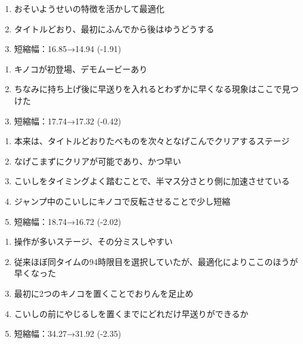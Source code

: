 \begin{enumerate}[label={\sarrow}]
\item おそいようせいの特徴を活かして最適化
\item タイトルどおり、最初にふんでから後はゆうどうする
\item 短縮幅：16.85→14.94 (-1.91)
\end{enumerate}



\begin{enumerate}[label={\sarrow}]
\item キノコが初登場、デモムービーあり
\item ちなみに持ち上げ後に早送りを入れるとわずかに早くなる現象はここで見つけた
\item 短縮幅：17.74→17.32 (-0.42)
\end{enumerate}



\clearpage
\begin{enumerate}[label={\sarrow}]
\item 本来は、タイトルどおりたべものを次々となげこんでクリアするステージ
\item なげこまずにクリアが可能であり、かつ早い
\item こいしをタイミングよく踏むことで、半マス分さとり側に加速させている
\item ジャンプ中のこいしにキノコで反転させることで少し短縮
\item 短縮幅：18.74→16.72 (-2.02)
\end{enumerate}



\begin{enumerate}[label={\sarrow}]
\item 操作が多いステージ、その分ミスしやすい
\item 従来ほぼ同タイムの94時限目を選択していたが、最適化によりここのほうが早くなった
\item 最初に2つのキノコを置くことでおりんを足止め
\item こいしの前にやじるしを置くまでにどれだけ早送りができるか
\item 短縮幅：34.27→31.92 (-2.35)
\end{enumerate}



